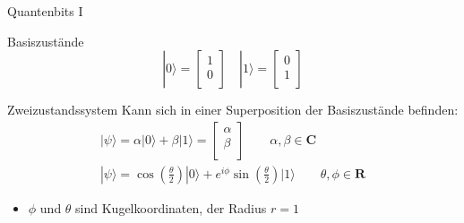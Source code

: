 \documentclass[compress,aspectratio=1610]{beamer}
\begin{document}
\begin{frame}{Quantenbits I}
  \begin{block}{Basiszust\"ande}
    \begin{equation}\nonumber
      |0\rangle = \begin{bmatrix}
        1 \\
        0 \\
      \end{bmatrix}
      \,\,\, \,\,\,
      |1\rangle = \begin{bmatrix}
        0 \\
        1 \\
      \end{bmatrix}
    \end{equation}
  \end{block}
  \begin{block}{Zweizustandssystem}
    Kann sich in einer Superposition der Basiszust\"ande befinden:
    \begin{equation}\nonumber
      \begin{gathered}
        |\psi\rangle = \alpha |0\rangle+\beta |1\rangle = \begin{bmatrix}
          \alpha \\
          \beta \\
        \end{bmatrix} \qquad \alpha, \beta \in \mathbf{C} \\[0.5em]
        |\psi\rangle = \cos\left(\frac{\theta}{2}\right)|0\rangle+e^{i\phi}\sin\left(\frac{\theta}{2}\right)|1\rangle \qquad \theta, \phi \in \mathbf{R}
      \end{gathered}
    \end{equation}
  \end{block}
  \begin{itemize}
  \item $\phi$ und $\theta$ sind Kugelkoordinaten, der Radius $r = 1$
  \end{itemize}
\end{frame}
\end{document}
